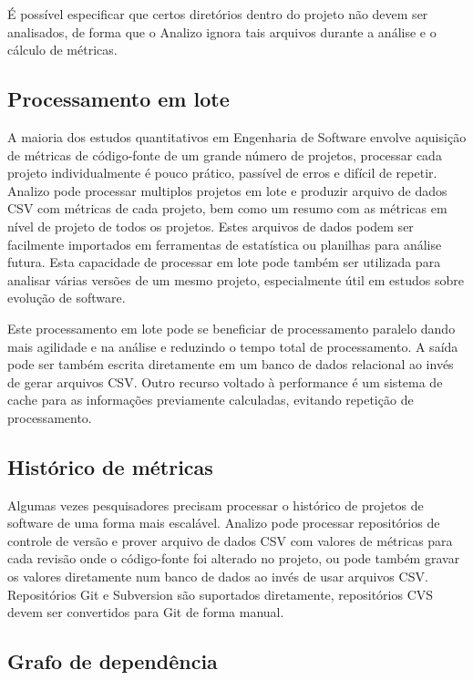 \documentclass{article}
\begin{document}
É possível especificar que certos diretórios dentro do projeto não devem ser
analisados, de forma que o Analizo ignora tais arquivos durante a análise e o
cálculo de métricas.

\subsection{Processamento em lote}\label{lote}

A maioria dos estudos quantitativos em Engenharia de Software envolve aquisição
de métricas de código-fonte de um grande número de projetos, processar cada
projeto individualmente é pouco prático, passível de erros e difícil de
repetir. Analizo pode processar multiplos projetos em lote e produzir arquivo
de dados CSV com métricas de cada projeto, bem como um resumo com as métricas
em nível de projeto de todos os projetos. Estes arquivos de dados podem ser
facilmente importados em ferramentas de estatística ou planilhas para análise
futura. Esta capacidade de processar em lote pode também ser utilizada para
analisar várias versões de um mesmo projeto, especialmente útil em estudos
sobre evolução de software.

Este processamento em lote pode se beneficiar de processamento paralelo dando
mais agilidade e na análise e reduzindo o tempo total de processamento.  A
saída pode ser também escrita diretamente em um banco de dados relacional ao
invés de gerar arquivos CSV. Outro recurso voltado à performance é um sistema
de cache para as informações previamente calculadas, evitando repetição de
processamento.

\subsection{Histórico de métricas}

Algumas vezes pesquisadores precisam processar o histórico de projetos de
software de uma forma mais escalável. Analizo pode processar repositórios de
controle de versão e prover arquivo de dados CSV com valores de métricas para
cada revisão onde o código-fonte foi alterado no projeto, ou pode também gravar
os valores diretamente num banco de dados ao invés de usar arquivos CSV. Repositórios Git e
Subversion são suportados diretamente, repositórios CVS devem ser convertidos
para Git de forma manual.

\subsection{Grafo de dependência}
\end{document}
